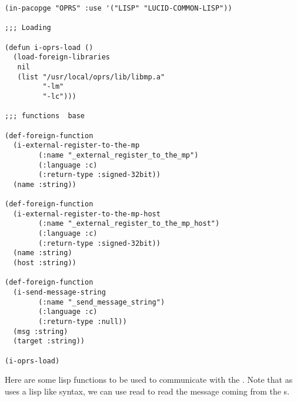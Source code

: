 \begin{verbatim}
(in-pacopge "OPRS" :use '("LISP" "LUCID-COMMON-LISP"))

;;; Loading

(defun i-oprs-load ()
  (load-foreign-libraries
   nil
   (list "/usr/local/oprs/lib/libmp.a"
         "-lm"
         "-lc")))

;;; functions  base

(def-foreign-function
  (i-external-register-to-the-mp
        (:name "_external_register_to_the_mp")
        (:language :c)
        (:return-type :signed-32bit))
  (name :string))

(def-foreign-function
  (i-external-register-to-the-mp-host
        (:name "_external_register_to_the_mp_host")
        (:language :c)
        (:return-type :signed-32bit))
  (name :string)
  (host :string))

(def-foreign-function
  (i-send-message-string
        (:name "_send_message_string")
        (:language :c)
        (:return-type :null))
  (msg :string)
  (target :string))

(i-oprs-load)
\end{verbatim}

Here are some lisp functions to be used to communicate with the
\MPA{}. Note that as \COPRS{} uses a lisp like syntax, we can use read to
read the message coming from the \CPK s.

